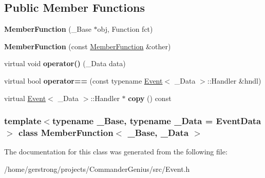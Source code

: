 \subsection*{Public Member Functions}
\begin{DoxyCompactItemize}
\item 
\hypertarget{class_member_function_ab4513afcaa59a433cfdc386d85f3af05}{
{\bfseries MemberFunction} (\_\-Base $\ast$obj, Function fct)}
\label{class_member_function_ab4513afcaa59a433cfdc386d85f3af05}

\item 
\hypertarget{class_member_function_ab76a9ee07ca385b5a3c4d7ae1e94cb06}{
{\bfseries MemberFunction} (const \hyperlink{class_member_function}{MemberFunction} \&other)}
\label{class_member_function_ab76a9ee07ca385b5a3c4d7ae1e94cb06}

\item 
\hypertarget{class_member_function_aacbe501c22a621c2209a27cd5894d391}{
virtual void {\bfseries operator()} (\_\-Data data)}
\label{class_member_function_aacbe501c22a621c2209a27cd5894d391}

\item 
\hypertarget{class_member_function_a5c69344c35020c0e79afaf6dfef4ae73}{
virtual bool {\bfseries operator==} (const typename \hyperlink{class_event}{Event}$<$ \_\-Data $>$::Handler \&hndl)}
\label{class_member_function_a5c69344c35020c0e79afaf6dfef4ae73}

\item 
\hypertarget{class_member_function_a02b263be76938d7dde8fa14d0de874ad}{
virtual \hyperlink{class_event}{Event}$<$ \_\-Data $>$::Handler $\ast$ {\bfseries copy} () const }
\label{class_member_function_a02b263be76938d7dde8fa14d0de874ad}

\end{DoxyCompactItemize}
\subsubsection*{template$<$typename \_\-Base, typename \_\-Data = EventData$>$ class MemberFunction$<$ \_\-Base, \_\-Data $>$}



The documentation for this class was generated from the following file:\begin{DoxyCompactItemize}
\item 
/home/gerstrong/projects/CommanderGenius/src/Event.h\end{DoxyCompactItemize}
